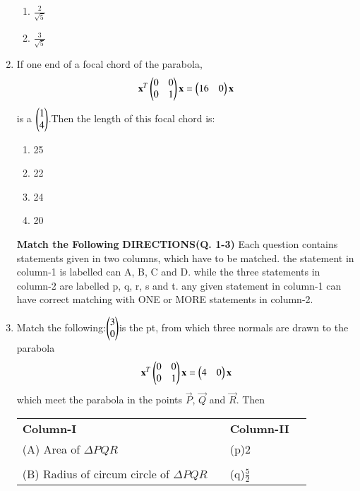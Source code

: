 \documentclass[journal,12pt,twocolumn]{IEEEtran}
\begin{document}
\begin{enumerate}[label=\arabic*]
\begin{enumerate}
    \item $\frac{2}{\sqrt{5}}$
    \item $\frac{3}{\sqrt{5}}$
    \end{enumerate}
    \item If one end of a focal chord of the parabola,
    \begin{align}
    \mathbf{x}^T\begin{pmatrix}0&0\\0&1\end{pmatrix}\mathbf{x}=\begin{pmatrix}16&0\end{pmatrix}\mathbf{x}
    \end{align} is a $\begin{pmatrix}1\\4\end{pmatrix}$.Then the length of this focal chord is:
    \begin{enumerate}
    \item 25
    \item 22
    \item 24
    \item 20
    \end{enumerate}
    \onecolumn
    {\textbf{Match the Following}}
	\textbf{DIRECTIONS(Q. 1-3)}
    Each question contains statements given in two columns, which have to be matched. the statement in column-1 is labelled can A, B, C and D. while the three statements in column-2 are labelled p, q, r, s and t. any given statement in column-1 can have correct matching with ONE or MORE statements in column-2. 
    \item Match the following:$\begin{pmatrix}3\\0\end{pmatrix}$is the pt, from which three normals are drawn to the parabola
    \begin{align}
    \mathbf{x}^T\begin{pmatrix}0&0\\0&1\end{pmatrix}\mathbf{x}=\begin{pmatrix}4&0\end{pmatrix}\mathbf{x}
    \end{align} which meet the parabola in the points $\vec{P}$, $\vec{Q}$ and $\vec{R}$. Then\\
  \begin{tabular}{llll}
    \textbf{Column-I}& \enspace &\textbf{Column-II}\\
    (A) Area of $\Delta PQR$ &\enspace &(p)$2$\\
    &&&\\
    (B) Radius of circum circle of $\Delta PQR$&\enspace & (q)$\frac{5}{2}$\\

\end{tabular}
\end{enumerate}
\end{document}
